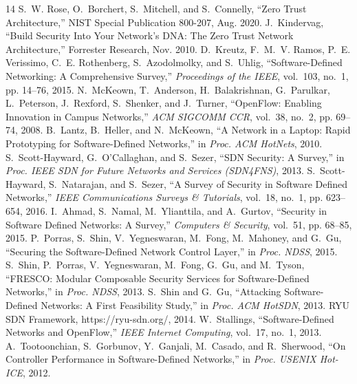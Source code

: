 \documentclass[journal]{IEEEtran}
\begin{document}
\begin{thebibliography}{14}
 S.~W. Rose, O.~Borchert, S.~Mitchell, and S.~Connelly, ``Zero Trust Architecture,'' NIST Special Publication 800-207, Aug. 2020.
 J.~Kindervag, ``Build Security Into Your Network's DNA: The Zero Trust Network Architecture,'' Forrester Research, Nov. 2010.
 D.~Kreutz, F.~M.~V. Ramos, P.~E. Verissimo, C.~E. Rothenberg, S.~Azodolmolky, and S.~Uhlig, ``Software-Defined Networking: A Comprehensive Survey,'' \emph{Proceedings of the IEEE}, vol.~103, no.~1, pp. 14--76, 2015.
 N.~McKeown, T.~Anderson, H.~Balakrishnan, G.~Parulkar, L.~Peterson, J.~Rexford, S.~Shenker, and J.~Turner, ``OpenFlow: Enabling Innovation in Campus Networks,'' \emph{ACM SIGCOMM CCR}, vol.~38, no.~2, pp. 69--74, 2008.
 B.~Lantz, B.~Heller, and N.~McKeown, ``A Network in a Laptop: Rapid Prototyping for Software-Defined Networks,'' in \emph{Proc. ACM HotNets}, 2010.
 S.~Scott-Hayward, G.~O'Callaghan, and S.~Sezer, ``SDN Security: A Survey,'' in \emph{Proc. IEEE SDN for Future Networks and Services (SDN4FNS)}, 2013.
 S.~Scott-Hayward, S.~Natarajan, and S.~Sezer, ``A Survey of Security in Software Defined Networks,'' \emph{IEEE Communications Surveys \& Tutorials}, vol.~18, no.~1, pp. 623--654, 2016.
 I.~Ahmad, S.~Namal, M.~Ylianttila, and A.~Gurtov, ``Security in Software Defined Networks: A Survey,'' \emph{Computers \& Security}, vol.~51, pp. 68--85, 2015.
 P.~Porras, S.~Shin, V.~Yegneswaran, M.~Fong, M.~Mahoney, and G.~Gu, ``Securing the Software-Defined Network Control Layer,'' in \emph{Proc. NDSS}, 2015.
 S.~Shin, P.~Porras, V.~Yegneswaran, M.~Fong, G.~Gu, and M.~Tyson, ``FRESCO: Modular Composable Security Services for Software-Defined Networks,'' in \emph{Proc. NDSS}, 2013.
 S.~Shin and G.~Gu, ``Attacking Software-Defined Networks: A First Feasibility Study,'' in \emph{Proc. ACM HotSDN}, 2013.
 RYU SDN Framework, https://ryu-sdn.org/, 2014.
 W.~Stallings, ``Software-Defined Networks and OpenFlow,'' \emph{IEEE Internet Computing}, vol.~17, no.~1, 2013.
 A.~Tootoonchian, S.~Gorbunov, Y.~Ganjali, M.~Casado, and R.~Sherwood, ``On Controller Performance in Software-Defined Networks,'' in \emph{Proc. USENIX Hot-ICE}, 2012.
\end{thebibliography}
\end{document}
